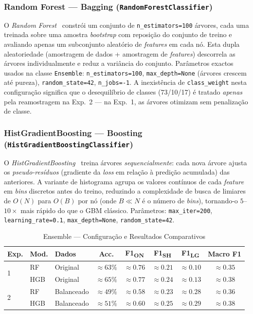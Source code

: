 \documentclass[conference]{IEEEtran}
\begin{document}
\subsubsection{Random Forest — Bagging (\texttt{RandomForestClassifier})}
O \textit{Random Forest}~\cite{breiman} constrói um conjunto de
\texttt{n\_estimators=100} árvores, cada uma treinada sobre uma amostra
\textit{bootstrap} com reposição do conjunto de treino e avaliando apenas um
subconjunto aleatório de \textit{features} em cada nó. Esta dupla aleatoriedade
(amostragem de dados + amostragem de \textit{features}) descorrela as árvores
individualmente e reduz a variância do conjunto. Parâmetros exactos usados na
classe \texttt{Ensemble}: \texttt{n\_estimators=100}, \texttt{max\_depth=None}
(árvores crescem até pureza), \texttt{random\_state=42}, \texttt{n\_jobs=-1}.
A inexistência de \texttt{class\_weight} nesta configuração significa que o
desequilíbrio de classes (73/10/17) é tratado \emph{apenas} pela reamostragem
na Exp.~2 — na Exp.~1, as árvores otimizam sem penalização de classe.

\subsubsection{HistGradientBoosting — Boosting (\texttt{HistGradientBoostingClassifier})}
O \textit{HistGradientBoosting}~\cite{friedman} treina árvores \emph{sequencialmente}:
cada nova árvore ajusta os \emph{pseudo-resíduos} (gradiente da \textit{loss}
em relação à predição acumulada) das anteriores. A variante de histograma
agrupa os valores contínuos de cada \textit{feature} em \textit{bins} discretos
antes do treino, reduzindo a complexidade de busca de limiares de $O(N)$ para
$O(B)$ por nó (onde $B \ll N$ é o número de \textit{bins}), tornando-o
$5$–$10\times$ mais rápido do que o GBM clássico. Parâmetros:
\texttt{max\_iter=200}, \texttt{learning\_rate=0.1}, \texttt{max\_depth=None},
\texttt{random\_state=42}.

\begin{table}[h]
\centering
\caption{Ensemble — Configuração e Resultados Comparativos}
\label{tab:ensemble}
\setlength{\tabcolsep}{2pt}
\begin{tabular}{p{0.5cm}p{0.7cm}p{1.0cm}ccccc}
\toprule
\textbf{Exp.} & \textbf{Mod.} & \textbf{Dados} & \textbf{Acc.} & \textbf{F1\textsubscript{ON}} & \textbf{F1\textsubscript{SH}} & \textbf{F1\textsubscript{LG}} & \textbf{Macro F1} \\
\midrule
\multirow{2}{*}{1} & RF  & Original & $\approx63\%$ & $\approx0.76$ & $\approx0.21$ & $\approx0.10$ & $\approx0.35$ \\
                   & HGB & Original & $\approx65\%$ & $\approx0.77$ & $\approx0.24$ & $\approx0.13$ & $\approx0.38$ \\
\midrule
\multirow{2}{*}{2} & RF  & Balanceado & $\approx49\%$ & $\approx0.58$ & $\approx0.23$ & $\approx0.28$ & $\approx0.36$ \\
                   & HGB & Balanceado & $\approx51\%$ & $\approx0.60$ & $\approx0.25$ & $\approx0.29$ & $\approx0.38$ \\
\bottomrule
\end{tabular}
\end{table}
\end{document}
